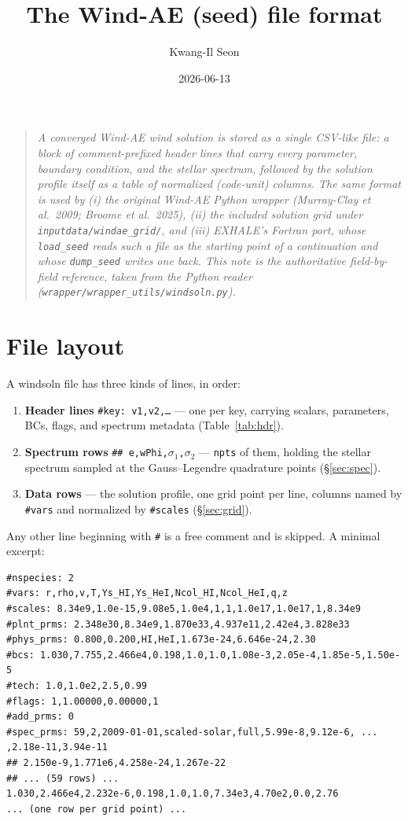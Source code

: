 \documentclass[english,a4paper]{my_memo}
\title{The Wind-AE \code{windsoln} (seed) file format}
\author{Kwang-Il Seon}
\date{2026-06-13}
\newcommand{\code}[1]{\texttt{#1}}
\newcommand{\hd}[1]{\code{\##1}}      %
\begin{document}
\maketitle

\begin{quote}\small\itshape
A converged Wind-AE wind solution is stored as a single CSV-like file: a
block of comment-prefixed header lines that carry every parameter,
boundary condition, and the stellar spectrum, followed by the solution
profile itself as a table of normalized (code-unit) columns. The same
format is used by (i) the original Wind-AE Python wrapper (Murray-Clay et
al.\ 2009; Broome et al.\ 2025), (ii) the included solution grid under
\code{inputdata/windae\_grid/}, and (iii) EXHALE's Fortran port, whose
\code{load\_seed} reads such a file as the starting point of a
continuation and whose \code{dump\_seed} writes one back. This note is the
authoritative field-by-field reference, taken from the Python reader
(\code{wrapper/wrapper\_utils/windsoln.py}).
\end{quote}

\section{File layout}
A windsoln file has three kinds of lines, in order:
\begin{enumerate}\itemsep2pt
  \item \textbf{Header lines} \code{\#key: v1,v2,\dots} --- one per key,
        carrying scalars, parameters, BCs, flags, and spectrum metadata
        (Table~\ref{tab:hdr}).
  \item \textbf{Spectrum rows} \code{\#\# e,wPhi,$\sigma_1$,$\sigma_2$}
        --- \code{npts} of them, holding the stellar spectrum sampled at
        the Gauss--Legendre quadrature points (\S\ref{sec:spec}).
  \item \textbf{Data rows} --- the solution profile, one grid point per
        line, columns named by \hd{vars} and normalized by \hd{scales}
        (\S\ref{sec:grid}).
\end{enumerate}
Any other line beginning with \code{\#} is a free comment and is skipped.
A minimal excerpt:
\begin{verbatim}
#nspecies: 2
#vars: r,rho,v,T,Ys_HI,Ys_HeI,Ncol_HI,Ncol_HeI,q,z
#scales: 8.34e9,1.0e-15,9.08e5,1.0e4,1,1,1.0e17,1.0e17,1,8.34e9
#plnt_prms: 2.348e30,8.34e9,1.870e33,4.937e11,2.42e4,3.828e33
#phys_prms: 0.800,0.200,HI,HeI,1.673e-24,6.646e-24,2.30
#bcs: 1.030,7.755,2.466e4,0.198,1.0,1.0,1.08e-3,2.05e-4,1.85e-5,1.50e-5
#tech: 1.0,1.0e2,2.5,0.99
#flags: 1,1.00000,0.00000,1
#add_prms: 0
#spec_prms: 59,2,2009-01-01,scaled-solar,full,5.99e-8,9.12e-6, ... ,2.18e-11,3.94e-11
## 2.150e-9,1.771e6,4.258e-24,1.267e-22
## ... (59 rows) ...
1.030,2.466e4,2.232e-6,0.198,1.0,1.0,7.34e3,4.70e2,0.0,2.76
... (one row per grid point) ...
\end{verbatim}
\end{document}
